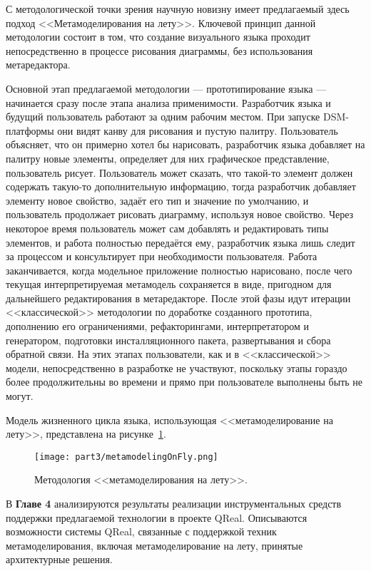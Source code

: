 С методологической точки зрения научную новизну имеет предлагаемый здесь подход 
<<Метамоделирования на лету>>. Ключевой принцип данной методологии состоит в том, 
что создание визуального языка проходит непосредственно в процессе рисования диаграммы, 
без использования метаредактора.

Основной этап предлагаемой методологии --- прототипирование языка --- начинается сразу 
после этапа анализа применимости. Разработчик языка и будущий пользователь работают 
за одним рабочим местом. При запуске DSM-платформы они видят канву для рисования и 
пустую палитру. Пользователь объясняет, что он примерно хотел бы нарисовать, разработчик 
языка добавляет на палитру новые элементы, определяет для них графическое представление, 
пользователь рисует. Пользователь может сказать, что такой-то элемент должен содержать 
такую-то дополнительную информацию, тогда разработчик добавляет элементу новое свойство, 
задаёт его тип и значение по умолчанию, и пользователь продолжает рисовать диаграмму, 
используя новое свойство. Через некоторое время пользователь может сам добавлять и 
редактировать типы элементов, и работа полностью передаётся ему, разработчик языка 
лишь следит за процессом и консультирует при необходимости пользователя. Работа заканчивается, 
когда модельное приложение полностью нарисовано, после чего текущая интерпретируемая 
метамодель сохраняется в виде, пригодном для дальнейшего редактирования в метаредакторе. 
После этой фазы идут итерации <<классической>> методологии по доработке созданного 
прототипа, дополнению его ограничениями, рефакторингами, интерпретатором и генератором, 
подготовки инсталляционного пакета, развертывания и сбора обратной связи. На этих этапах 
пользователи, как и в <<классической>> модели, непосредственно в разработке не участвуют, 
поскольку этапы гораздо более продолжительны во времени и прямо при пользователе выполнены 
быть не могут.

Модель жизненного цикла языка, использующая <<метамоделирование на лету>>, представлена 
на рисунке~\ref{metamodelingOnFly}.

\begin{figure} [ht]
	\begin{center}
		\texttt{[image: part3/metamodelingOnFly.png]}
		\caption{Методология <<метамоделирования на лету>>.}
		\label{metamodelingOnFly}
	\end{center}
\end{figure}

В \textbf{Главе 4} анализируются результаты реализации инструментальных средств поддержки предлагаемой 
технологии в проекте QReal. Описываются возможности системы QReal, связанные с поддержкой 
техник метамоделирования, включая метамоделирование на лету, принятые архитектурные 
решения.

